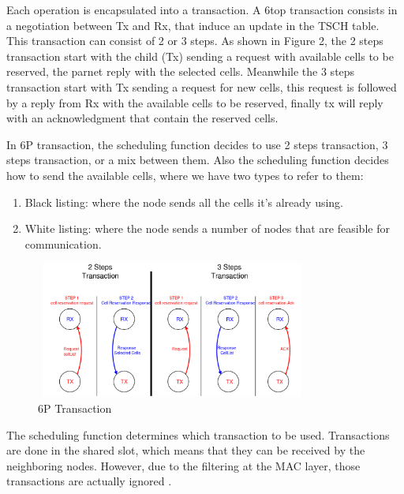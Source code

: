 \documentclass[10pt, conference, compsocconf]{IEEEtran}
\begin{document}
Each operation is encapsulated into a transaction. A  6top transaction consists in a negotiation between Tx and Rx, that induce an update in the TSCH table. This transaction can consist of 2 or 3 steps. As shown in Figure 2, the 2 steps transaction start with the child (Tx) sending a request with available cells to be reserved, the parnet reply with the selected cells. Meanwhile the 3 steps transaction start with Tx sending a request for new cells, this request is followed by a reply from Rx with the available cells to be reserved, finally tx will reply with an acknowledgment that contain the reserved cells. 

In 6P transaction, the scheduling function decides to use 2 steps transaction, 3 steps transaction, or a mix between them. Also the scheduling function decides how to send the available cells, where we have two types to refer to them: 
\begin{enumerate}

\item Black listing: where the node sends all the cells it's already using.

\item White listing: where the node sends a number of nodes that are feasible for communication. 



\end{enumerate}


   

\begin{figure}[h]
    \centering
    \includegraphics[width=9cm, height=4.5cm]{2,3steps.png}
    \caption{6P Transaction}
    \label{fig:Collision in 6TiSCH Networks}
\end{figure}



The scheduling function determines which transaction to be used. Transactions are done in the shared slot, which means that they can be received by the neighboring nodes. However, due to the filtering at the MAC layer, those transactions are actually ignored .
\end{document}
